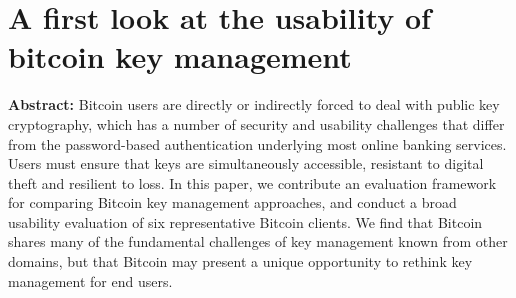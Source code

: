 \section{A first look at the usability of bitcoin key management}

\textbf{Abstract:} 
Bitcoin users are directly or indirectly forced to deal with public key cryptography, which has a number of security and usability challenges that differ from the password-based authentication underlying most online banking services. Users must ensure that keys are simultaneously accessible, resistant to digital theft and resilient to loss. In this paper, we contribute an evaluation framework for comparing Bitcoin key management approaches, and conduct a broad usability evaluation of six representative Bitcoin clients. We find that Bitcoin shares many of the fundamental challenges of key management known from other domains, but that Bitcoin may present a unique opportunity to rethink key management for end users.

